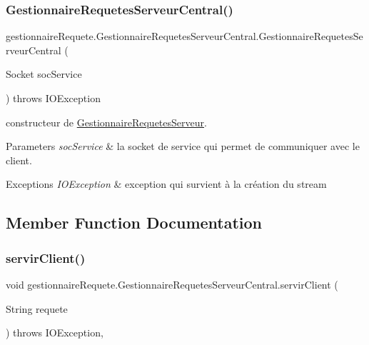 \subsubsection{\texorpdfstring{Gestionnaire\+Requetes\+Serveur\+Central()}{GestionnaireRequetesServeurCentral()}}
{\footnotesize\ttfamily gestionnaire\+Requete.\+Gestionnaire\+Requetes\+Serveur\+Central.\+Gestionnaire\+Requetes\+Serveur\+Central (\begin{DoxyParamCaption}\item[{Socket}]{soc\+Service }\end{DoxyParamCaption}) throws I\+O\+Exception\hspace{0.3cm}{\ttfamily [inline]}}



constructeur de \hyperlink{classgestionnaireRequete_1_1GestionnaireRequetesServeur}{Gestionnaire\+Requetes\+Serveur}. 


\begin{DoxyParams}{Parameters}
{\em soc\+Service} & la socket de service qui permet de communiquer avec le client. \\
\hline
\end{DoxyParams}

\begin{DoxyExceptions}{Exceptions}
{\em I\+O\+Exception} & exception qui survient à la création du stream \\
\hline
\end{DoxyExceptions}


\subsection{Member Function Documentation}
\mbox{\label{classgestionnaireRequete_1_1GestionnaireRequetesServeurCentral_a7e4ac9416e0d8c5d68857775aea589d6}} 
\subsubsection{\texorpdfstring{servir\+Client()}{servirClient()}}
{\footnotesize\ttfamily void gestionnaire\+Requete.\+Gestionnaire\+Requetes\+Serveur\+Central.\+servir\+Client (\begin{DoxyParamCaption}\item[{String}]{requete }\end{DoxyParamCaption}) throws I\+O\+Exception\hspace{0.3cm}{\ttfamily [inline]}, {\ttfamily [protected]}}



